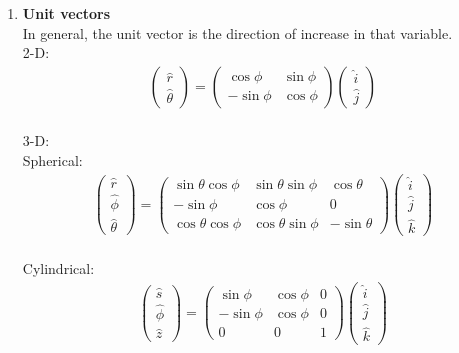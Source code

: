 \documentclass[12pt, oneside]{book}
\begin{document}
\begin{itemize}
\begin{enumerate}
   \item \textbf{Unit vectors} \\
   In general, the unit vector is the direction of increase in that variable.\\
   2-D: 
   \begin{gather}
   	\begin{pmatrix}
   		\hat{r}\\
   		\hat{\theta}
   	\end{pmatrix}
   =
   \begin{pmatrix}
   	\cos\phi & \sin\phi \\
   	-\sin\phi& \cos\phi
   \end{pmatrix}
   \begin{pmatrix}
   	\hat{i}\\
   	\hat{j}
   \end{pmatrix}
   \end{gather}\\
3-D:\\
Spherical:\\
   \begin{gather}
   	\begin{pmatrix}
   		\hat{r}\\
   		\hat{\phi}\\
   		\hat{\theta}
   	\end{pmatrix}
   =
   \begin{pmatrix}
   	\sin\theta\cos\phi & \sin\theta\sin\phi & \cos\theta \\
   	-\sin\phi          & \cos\phi           & 0          \\
   	\cos\theta\cos\phi & \cos\theta\sin\phi & -\sin\theta  
   \end{pmatrix} 
\begin{pmatrix}
	\hat{i}\\
	\hat{j}\\
	\hat{k}
\end{pmatrix}
   \end{gather} \\
Cylindrical:\\
\begin{gather}
   	\begin{pmatrix}
	\hat{s}\\
	\hat{\phi}\\
	\hat{z}
\end{pmatrix}
=
\begin{pmatrix}
	\sin \phi & \cos \phi & 0 \\
	-\sin\phi & \cos\phi  & 0          \\
	0         & 0         & 1
\end{pmatrix} 
\begin{pmatrix}
	\hat{i}\\
	\hat{j}\\
	\hat{k}
\end{pmatrix}
\end{gather}


\end{enumerate}
\end{itemize}
\end{document}
